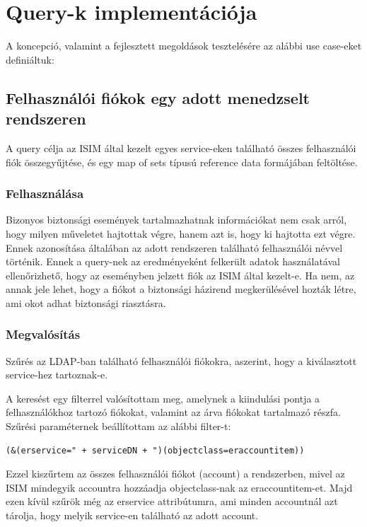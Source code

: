\section{Query-k implementációja} \label{sec:queryk}

A koncepció, valamint a fejlesztett megoldások tesztelésére az alábbi use case-eket definiáltuk:

\subsection{Felhasználói fiókok egy adott menedzselt rendszeren}
	A query célja az ISIM által kezelt egyes service-eken található összes felhasználói fiók összegyűjtése, és egy map of sets típusú reference data formájában feltöltése. 
	\subsubsection{Felhasználása} 
		Bizonyos biztonsági események tartalmazhatnak információkat nem csak arról, hogy milyen műveletet hajtottak végre, hanem azt is, hogy ki hajtotta ezt végre. Ennek azonosítása általában az adott rendszeren található felhasználói névvel történik. Ennek a query-nek az eredményeként felkerült adatok használatával ellenőrizhető, hogy az eseményben jelzett fiók az ISIM által kezelt-e. Ha nem, az annak jele lehet, hogy a fiókot a biztonsági házirend megkerülésével hozták létre, ami okot adhat biztonsági riasztásra.
		 
	\subsubsection{Megvalósítás}
		Szűrés az LDAP-ban található felhasználói fiókokra, aszerint, hogy a kiválasztott service-hez tartoznak-e.
		
		A keresést egy filterrel valósítottam meg, amelynek a kiindulási pontja a felhasználókhoz tartozó fiókokat, valamint az árva fiókokat tartalmazó részfa. Szűrési paraméternek beállítottam az alábbi filter-t: 
\begin{lstlisting}
(&(erservice=" + serviceDN + ")(objectclass=eraccountitem))
\end{lstlisting}
	Ezzel kiszűrtem az összes felhasználói fiókot (account) a rendszerben, mivel az ISIM mindegyik accountra hozzáadja objectclass-nak az eraccountitem-et. Majd ezen kívül szűrök még az erservice attribútumra, ami minden accountnál azt tárolja, hogy melyik service-en található az adott account.
	
